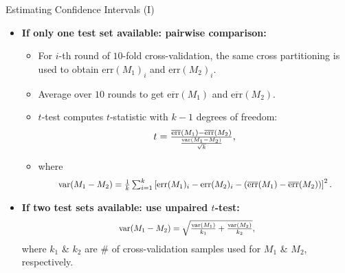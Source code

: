 \begin{frame}{Estimating Confidence Intervals (I)}
	\begin{itemize}
		\item \textbf{If only one test set available: pairwise comparison:}
		      \begin{itemize}
			      \item For $i$-th round of $10$-fold cross-validation, the same cross partitioning is used to obtain $\text{err}(M_1)_i$ and $\text{err}(M_2)_i$.
			      \item Average over $10$ rounds to get $\overline{\text{err}}(M_1)$ and $\overline{\text{err}}(M_2)$.
			      \item $t$-test computes $t$-statistic with $k-1$ degrees of freedom:
			            \begin{align*}
				            \resizebox{3cm}{!}{%
					            $t = \frac{\overline{\text{err}}(M_1)- \overline{\text{err}}(M_2)}{\frac{\text{var}(M_1-M_2)}{\sqrt{k}}},$}
			            \end{align*}
			      \item where
			            \begin{align*}
				            \resizebox{10cm}{!}{%
					            $\text{var}(M_1-M_2) = \frac{1}{k} \sum_{i=1}^{k} \left[ \text{err}(M_1)_i - \text{err}(M_2)_i - (\overline{\text{err}}(M_1) - \overline{\text{err}}(M_2))\right]^2.$}
			            \end{align*}
		      \end{itemize}
		\item \textbf{If two test sets available: use unpaired $t$-test:}
		      \begin{align*}
			      \resizebox{5cm}{!}{%
				      $\text{var}(M_1-M_2) = \sqrt{\frac{\text{var}(M_1)}{k_1} + \frac{\text{var}(M_2)}{k_2}},$}
		      \end{align*}
		      where $k_1$ \& $k_2$ are $\#$ of cross-validation samples used for $M_1$ \& $M_2$, respectively.
	\end{itemize}
\end{frame}

